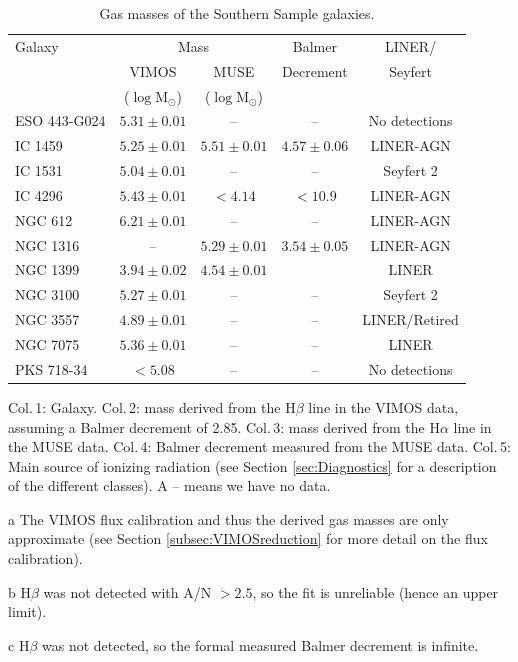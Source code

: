 \begin{table}
	\centering
\begin{threeparttable}
	\caption{Gas masses of the Southern Sample galaxies.}
	\label{tab:gasMass}
	\begin{tabular}{l c c c c}
		\hline
		\hline
		Galaxy & \multicolumn{2}{c}{\ion{H}{ii} Mass} & Balmer & LINER/ \\
		& VIMOS\tnote{a} & MUSE & Decrement & Seyfert \\
		& ($\log\mathrm{M_\odot}$) & ($\log\mathrm{M_\odot}$) & \\
		\hline
		ESO 443-G024 & $5.31 \pm 0.01$ 	& --  		& -- & No detections \\
		IC 1459 	& $5.25 \pm 0.01$	& $5.51 \pm 0.01$ & $4.57 \pm 0.06$ & LINER-AGN\\
		IC 1531 	& $5.04 \pm 0.01$	& -- 		& -- & Seyfert 2\\
		IC 4296		& $5.43 \pm 0.01$	& $< 4.14$ 	& $<10.9$\tnote{b} & LINER-AGN \\
		NGC 612 	& $6.21 \pm 0.01$ 	& -- 		& -- & LINER-AGN \\
		NGC 1316 	& -- 				& $ 5.29 \pm 0.01$ & $3.54 \pm 0.05$ & LINER-AGN \\
		NGC 1399 	& $3.94 \pm 0.02$ 	& $ 4.54 \pm 0.01$ & \tnote{c} & LINER \\
		NGC 3100 	& $5.27 \pm 0.01$	& -- 		& -- & Seyfert 2 \\
		NGC 3557 	& $4.89 \pm 0.01$ 	& -- 		& -- & LINER/Retired \\
		NGC 7075 	& $5.36 \pm 0.01$	& -- 		& -- & LINER \\
		PKS 718-34  & $< 5.08$	 		& -- 		& -- & No detections \\
		\hline
		\hline
	\end{tabular}
	\begin{tablenotes}
	\footnotesize
	\note Col.\,1: Galaxy. Col.\,2:  mass derived from the H$\beta$ line in the VIMOS data, assuming a Balmer decrement of 2.85. Col.\,3:  mass derived from the H$\alpha$ line in the MUSE data. Col.\,4: Balmer decrement measured from the MUSE data. Col.\,5: Main source of ionizing radiation (see Section \ref{sec:Diagnostics} for a description of the different classes). A -- means we have no data.
	\item [a] The VIMOS flux calibration and thus the derived gas masses are only approximate (see Section \ref{subsec:VIMOSreduction} for more detail on the flux calibration).
	\item [b] H$\beta$ was not detected with A/N $> 2.5$, so the fit is unreliable (hence an upper limit). 
	\item [c] H$\beta$ was not detected, so the formal measured Balmer decrement is infinite. 
	\end{tablenotes}
\end{threeparttable}
\end{table}


